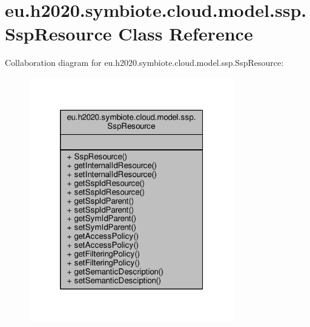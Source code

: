 \hypertarget{classeu_1_1h2020_1_1symbiote_1_1cloud_1_1model_1_1ssp_1_1SspResource}{}\section{eu.\+h2020.\+symbiote.\+cloud.\+model.\+ssp.\+Ssp\+Resource Class Reference}
\label{classeu_1_1h2020_1_1symbiote_1_1cloud_1_1model_1_1ssp_1_1SspResource}


Collaboration diagram for eu.\+h2020.\+symbiote.\+cloud.\+model.\+ssp.\+Ssp\+Resource\+:\nopagebreak
\begin{figure}[H]
\begin{center}
\leavevmode
\includegraphics[width=254pt]{classeu_1_1h2020_1_1symbiote_1_1cloud_1_1model_1_1ssp_1_1SspResource__coll__graph}
\end{center}
\end{figure}
